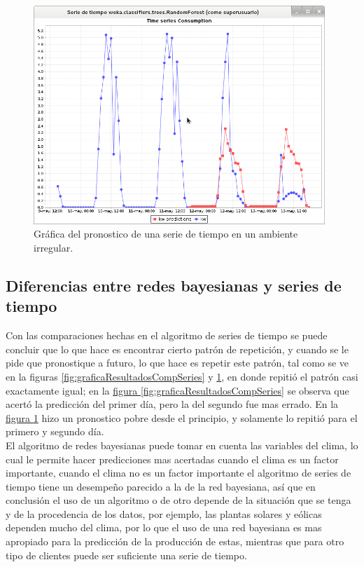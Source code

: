 \begin{figure}[!h]
	\centering
	\includegraphics[width=11cm]{img/graficaSerieIrregluar.png}
	\caption{Gráfica del pronostico de una serie de tiempo en un ambiente irregular.}
	\label{fig:graficaSerieIrregluar}
\end{figure}

\subsection{Diferencias entre redes bayesianas y series de tiempo}
Con las comparaciones hechas en el algoritmo de series de tiempo se puede concluir que lo que hace es encontrar cierto patrón de repetición, y cuando se le pide que pronostique a futuro, lo que hace es repetir este patrón, tal como se ve en la figuras 
\ref{fig:graficaResultadosCompSeries} y \ref{fig:graficaSerieIrregluar}, en donde repitió el patrón casi exactamente igual; en la 
\hyperref[fig:graficaResultadosCompSeries]{ figura \ref{fig:graficaResultadosCompSeries}} se observa que acertó la predicción del primer día, pero la del segundo fue mas errado. En la 
\hyperref[fig:graficaSerieIrregluar]{ figura \ref{fig:graficaSerieIrregluar}} hizo un pronostico pobre desde el principio, y solamente lo repitió para el primero y segundo día.\\
El algoritmo de redes bayesianas puede tomar en cuenta las variables del clima, lo cual le permite hacer predicciones mas acertadas cuando el clima es un factor importante, cuando el clima no es un factor importante el algoritmo de series de tiempo tiene un desempeño parecido a la de la red bayesiana, así que en conclusión el uso de un algoritmo o de otro depende de la situación que se tenga y de la procedencia de los datos, por ejemplo, las plantas solares y eólicas dependen mucho del clima, por lo que el uso de una red bayesiana es mas apropiado para la predicción de la producción de estas, mientras que para otro tipo de clientes puede ser suficiente una serie de tiempo.

